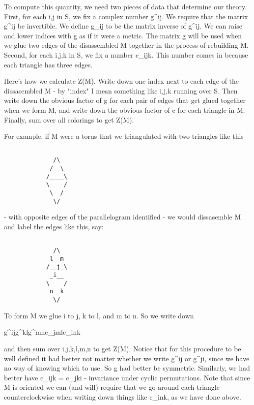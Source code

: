 To compute this quantity, we need two pieces of data that determine our
theory.  First, for each i,j in S, we fix a complex number g^{ij}.  
We require that the matrix g^{ij} be invertible.   We define g_{ij} to
be the matrix inverse of g^{ij}.  We can raise and lower indices with g
as if it were a metric.  The matrix g will be used when we glue two edges of
the disassembled M together in the process of rebuilding M.   Second,
for each i,j,k in S, we fix a number c_{ijk}.  This number comes in
because each triangle has three edges. 

Here's how we calculate Z(M).  Write down one index next to each edge
of the dissasembled M - by "index" I mean something like i,j,k running
over S.  Then write down the obvious factor of g for each pair of edges that
get glued together when we form M, and write down the obvious factor of
c for each triangle in M.  Finally, sum over all colorings to get Z(M).  

For example, if M were a torus that we triangulated with two triangles
like this 
                 

\begin{verbatim}

              /\
             /  \
            /____\
            \    /   
             \  /          
              \/     
\end{verbatim}
    

- with opposite edges of the parallelogram identified -  we would
dissasemble M and label the edges like this, say:

                

\begin{verbatim}

              /\
             l  m
            /__j_\
             _i__
            \    /   
             n  k          
              \/     
\end{verbatim}
    

To form M we glue i to j, k to l, and m to n.  So we write down

g^{ij}g^{kl}g^{mn}c_{jml}c_{ink}

and then sum over i,j,k,l,m,n to get Z(M).  Notice that for this
procedure to be well defined it had better not matter whether we write
g^{ij} or g^{ji}, since we have no way of knowing which to use.  So g
had better be symmetric.  Similarly, we had better have c_{ijk} =
c_{jki} - invariance under cyclic permutations.   Note that since M is
oriented we can (and will) require that we go around each triangle 
counterclockwise when writing down things like c_{ink}, as we have done
above.  

